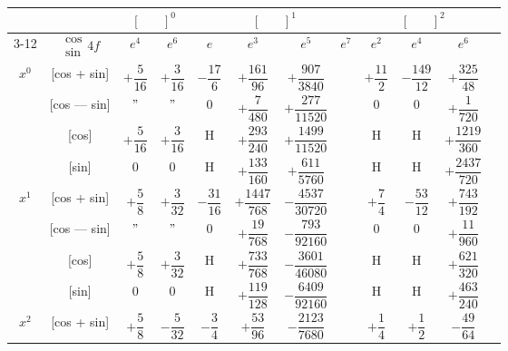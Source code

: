 \documentclass[11pt,a4paper]{book}
\begin{document}
\vspace{1em}

\newpage
{}

\begin{center}
\small
\begin{tabular}{|c|c|c|c|c|c|c|c|c|c|c|c|}
\hline
& & \multicolumn{2}{c|}{$[\phantom{()}]^0$} & \multicolumn{4}{c|}{$[\phantom{()}]^1$} & \multicolumn{3}{c|}{$[\phantom{()}]^2$} \\
\cline{3-12}
& $\begin{smallmatrix} \cos \\ \sin \end{smallmatrix} 4f$ & $e^4$ & $e^6$ & $e$ & $e^3$ & $e^5$ & $e^7$ & $e^2$ & $e^4$ & $e^6$ \\
\hline
\multirow{4}{*}{$x^0$} & [cos + sin] & $+\dfrac{5}{16}$ & $+\dfrac{3}{16}$ & $-\dfrac{17}{6}$ & $+\dfrac{161}{96}$ & $+\dfrac{907}{3840}$ & & $+\dfrac{11}{2}$ & $-\dfrac{149}{12}$ & $+\dfrac{325}{48}$ \\
& [cos --- sin] & $"$ & $"$ & $0$ & $+\dfrac{7}{480}$ & $+\dfrac{277}{11520}$ & & $0$ & $0$ & $+\dfrac{1}{720}$ \\
& [cos] & $+\dfrac{5}{16}$ & $+\dfrac{3}{16}$ & H & $+\dfrac{293}{240}$ & $+\dfrac{1499}{11520}$ & & H & H & $+\dfrac{1219}{360}$ \\
& [sin] & $0$ & $0$ & H & $+\dfrac{133}{160}$ & $+\dfrac{611}{5760}$ & & H & H & $+\dfrac{2437}{720}$ \\
\hline
\multirow{4}{*}{$x^1$} & [cos + sin] & $+\dfrac{5}{8}$ & $+\dfrac{3}{32}$ & $-\dfrac{31}{16}$ & $+\dfrac{1447}{768}$ & $-\dfrac{4537}{30720}$ & & $+\dfrac{7}{4}$ & $-\dfrac{53}{12}$ & $+\dfrac{743}{192}$ \\
& [cos --- sin] & $"$ & $"$ & $0$ & $+\dfrac{19}{768}$ & $-\dfrac{793}{92160}$ & & $0$ & $0$ & $+\dfrac{11}{960}$ \\
& [cos] & $+\dfrac{5}{8}$ & $+\dfrac{3}{32}$ & H & $+\dfrac{733}{768}$ & $-\dfrac{3601}{46080}$ & & H & H & $+\dfrac{621}{320}$ \\
& [sin] & $0$ & $0$ & H & $+\dfrac{119}{128}$ & $-\dfrac{6409}{92160}$ & & H & H & $+\dfrac{463}{240}$ \\
\hline
\multirow{4}{*}{$x^2$} & [cos + sin] & $+\dfrac{5}{8}$ & $-\dfrac{5}{32}$ & $-\dfrac{3}{4}$ & $+\dfrac{53}{96}$ & $-\dfrac{2123}{7680}$ & & $+\dfrac{1}{4}$ & $+\dfrac{1}{2}$ & $-\dfrac{49}{64}$ \\

\end{tabular}
\end{center}
\end{document}

